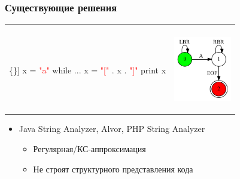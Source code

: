 \documentclass{beamer}
\begin{document}
\begin{frame}[fragile]
	\transwipe[direction=90]
	\frametitle{Существующие решения} 
		\begin{table}[h]
			\centering
			\begin{tabular}{p{4.6cm} p{4.6cm}}
				\begin{center}
					\begin{Verbatim}[commandchars=\\\{\}]
x = \textcolor{red}{"a"}
while ...
    x = \textcolor{red}{"["} . x . \textcolor{red}{"]"}
print x
					\end{Verbatim}
				\end{center}
				&
				\begin{center}
					\includegraphics[width=2.5cm]{pictures/reg_app.pdf}	
				\end{center}	  		
			\end{tabular}
		\end{table}
		\begin{itemize}
			\item Java String Analyzer, Alvor, PHP String Analyzer
			\begin{itemize}
				\item Регулярная/КС-аппроксимация
				\item Не строят структурного представления кода
			\end{itemize}
		\end{itemize}
\end{frame}
\end{document}
